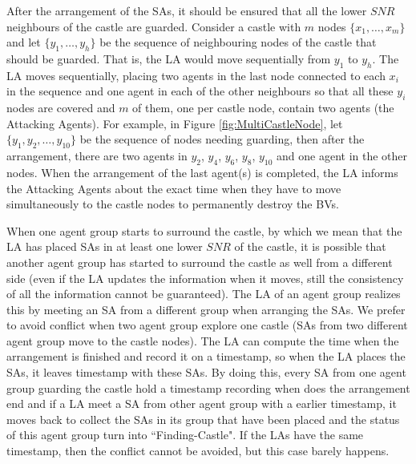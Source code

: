 
After the arrangement of the SAs, it should be ensured that all the lower $SNR$ neighbours of the castle are guarded. 
Consider a castle with $m$ nodes  $\{x_1, \ldots, x_m\}$ and let 
 $\{y_1, \ldots, y_h\}$ be the sequence of neighbouring nodes of the castle that should be guarded. That is, the LA would move sequentially from $y_1$ to $y_h$.
The LA  moves sequentially, placing two agents in the last node connected to each $x_i$ in the sequence and one agent in each of the other neighbours so that all these $y_i$
 nodes are covered and $m$ of them, one per castle node, contain two agents (the Attacking Agents).  
For example, in Figure \ref{fig:MultiCastleNode}, let  $\{y_1, y_2, \ldots, y_{10}\}$ be the sequence of nodes needing guarding, then after the arrangement, there are two agents in $y_2$, $y_4$, $y_6$, $y_8$, $y_{10}$ and one agent in the other nodes.
When   the arrangement of the last agent(s) is completed, the LA 
 informs the Attacking Agents about the  exact time  when they have to move simultaneously  
 to the castle nodes to permanently destroy the BVs.

When one agent group starts to surround the castle, by which we mean that the LA has placed SAs in at least one lower $SNR$ of the castle, it is possible that another agent group has started to surround the castle  as well from a different side 
(even if the LA updates the information when it moves, still the consistency of all the information cannot be guaranteed). The LA of an agent group realizes this by meeting an SA  from a different group when   arranging
 the SAs.
 We prefer to avoid conflict when two agent group explore one castle (SAs from two different agent group move to the castle nodes). The LA can compute the time when the arrangement is finished and record it on a timestamp, so when the LA places the SAs, it leaves timestamp with these SAs. By doing this, every SA from one agent group guarding the castle hold a timestamp recording when does the arrangement end and if a LA meet a SA from other agent group with a earlier timestamp, it moves back to collect the SAs in its group that have been placed and the status of this agent group turn into ``Finding-Castle". If the LAs have the same timestamp, then the conflict cannot be avoided, but this case barely happens.  

